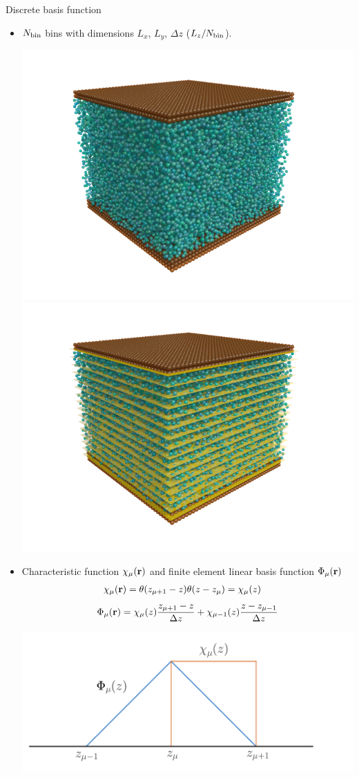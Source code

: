 \documentclass{beamer}
\begin{document}
\begin{frame}{Discrete basis function}
  \begin{itemize}
    \item $N_{\rm bin}$ bins with dimensions $L_x$, $L_y$, $\Delta z$ ($L_z/N_{\rm bin}$). 
      \begin{center}
        \includegraphics[width=.3\linewidth]{PRL3_gold2_wo_layers_wo_diffuse}
        \includegraphics[width=.3\linewidth]{PRL3_gold2_wo_diffuse}
      \end{center}
    \item  Characteristic function $\chi_{\mu}({\bf r})$ and finite element linear basis function $\Phi_{\mu}({\bf r})$
    \begin{align}
    \chi_\mu({\bf r})&=\theta(z_{\mu+ 1}-z)\theta(z-z_\mu)=\chi_\mu(z)
    \nonumber
    \end{align}
    \begin{align}
      \Phi_\mu({\bf r})=\chi_\mu(z)\frac{z_{\mu+1}-z}{\Delta z}+\chi_{\mu-1}(z)\frac{z-z_{\mu-1}}{\Delta z}
      \nonumber
    \end{align}
    \begin{center} 
      \includegraphics[scale=0.16]{psichi}
    \end{center}
  \end{itemize}
\end{frame}
\end{document}
